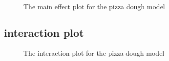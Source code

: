 \documentclass[
  a4paper,
]{scrbook}
\begin{document}
\begin{figure}[ht]


\caption{\label{fig-pd-me}The main effect plot for the pizza dough
model}

\end{figure}%

\subsection{interaction plot}\label{interaction-plot}

\begin{figure}[ht]


\caption{\label{fig-pd-ie}The interaction plot for the pizza dough
model}

\end{figure}%
\end{document}
